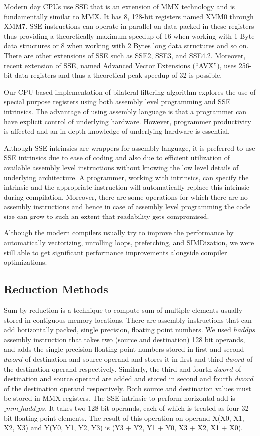 \documentclass{IEEEtran}
\begin{document}
Modern day CPUs use SSE that is an extension of MMX technology and is fundamentally similar to MMX. It has 8, 128-bit registers named XMM0 through XMM7. SSE instructions can operate in parallel on data packed in these registers thus providing a theoretically maximum speedup of 16 when working with 1 Byte data structures or 8 when working with 2 Bytes long data structures and so on. There are other extensions of SSE such as SSE2, SSE3, and SSE4.2. Moreover, recent extension of SSE, named Advanced Vector Extensions (``AVX''), uses 256-bit data registers and thus a theoretical peak speedup of 32 is possible.

Our CPU based implementation of bilateral filtering algorithm explores the use of special purpose registers using both assembly level programming and SSE intrinsics. The advantage of using assembly language is that a programmer can have explicit control of underlying hardware. However, programmer productivity is affected and an in-depth knowledge of underlying hardware is essential. 

Although SSE intrinsics are wrappers for assembly language, it is preferred to use SSE intrinsics due to ease of coding and also due to efficient utilization of available assembly level instructions without knowing the low level details of underlying architecture. A programmer, working with intrinsics, can specify the intrinsic and the appropriate instruction will automatically replace this intrinsic during compilation. Moreover, there are some operations for which there are no assembly instructions and hence in case of assembly level programming the code size can grow to such an extent that readability gets compromised.  

Although the modern compilers usually try to improve the performance by automatically vectorizing, unrolling loops, prefetching, and SIMDization, we were still able to get significant performance improvements alongside compiler optimizations.

\subsection{Reduction Methods}
\label{sub:reduction} Sum by reduction is a technique to compute sum of multiple elements usually stored in contiguous memory locations. There are assembly instructions that can add horizontally packed, single precision, floating point numbers. We used $haddps$ assembly instruction that takes two (source and destination) 128 bit operands, and adds the single precision floating point numbers stored in first and second $dword$ of destination and source operand and stores it in first and third $dword$ of the destination operand respectively. Similarly, the third and fourth $dword$ of destination and source operand are added and stored in second and fourth $dword$ of the destination operand respectively. Both source and destination values must be stored in MMX registers. The SSE intrinsic to perform horizontal add is $\_mm\_hadd\_ps$. It takes two 128 bit operands, each of which is treated as four 32-bit floating point elements. The result of this operation on operand X(X0, X1, X2, X3) and Y(Y0, Y1, Y2, Y3) is (Y3 + Y2, Y1 + Y0, X3 + X2, X1 + X0).
\end{document}
